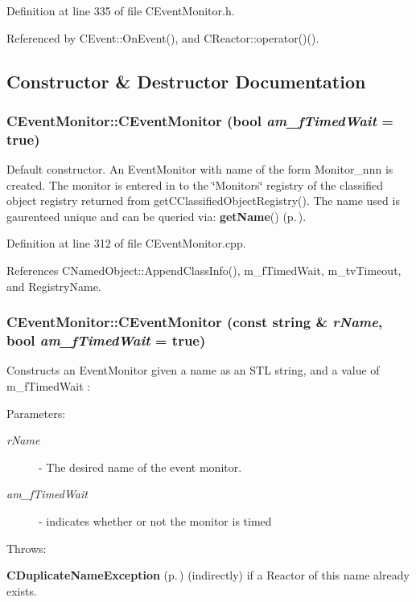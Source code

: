 Definition at line 335 of file CEvent\-Monitor.h.

Referenced by CEvent::On\-Event(), and CReactor::operator()().

\subsection{Constructor \& Destructor Documentation}
\subsubsection{\setlength{\rightskip}{0pt plus 5cm}CEvent\-Monitor::CEvent\-Monitor (bool {\em am\_\-f\-Timed\-Wait} = true)}\label{classCEventMonitor_a0}


Default constructor. An Event\-Monitor with name of the form Monitor\_\-nnn is created. The monitor is entered in to the \char`\"{}Monitors\char`\"{} registry of the  classified object registry returned from get\-CClassified\-Object\-Registry(). The name used is gaurenteed unique and can be queried via: {\bf get\-Name}() {\rm (p.\,\pageref{classCNamedObject_a6})}. 

Definition at line 312 of file CEvent\-Monitor.cpp.

References CNamed\-Object::Append\-Class\-Info(), m\_\-f\-Timed\-Wait, m\_\-tv\-Timeout, and Registry\-Name.
\subsubsection{\setlength{\rightskip}{0pt plus 5cm}CEvent\-Monitor::CEvent\-Monitor (const string \& {\em r\-Name}, bool {\em am\_\-f\-Timed\-Wait} = true)}\label{classCEventMonitor_a1}


Constructs an Event\-Monitor given a name as an STL string, and a value of m\_\-f\-Timed\-Wait :\begin{Desc}
\item[Parameters: ]\par
\begin{description}
\item[{\em 
r\-Name}]- The desired name of the event monitor. \item[{\em 
am\_\-f\-Timed\-Wait}]- indicates whether or not the monitor is timed\end{description}
\end{Desc}
Throws:\begin{CompactItemize}
\item 
{\bf CDuplicate\-Name\-Exception} {\rm (p.\,\pageref{classCDuplicateNameException})} (indirectly) if a Reactor of this name already exists. \end{CompactItemize}


